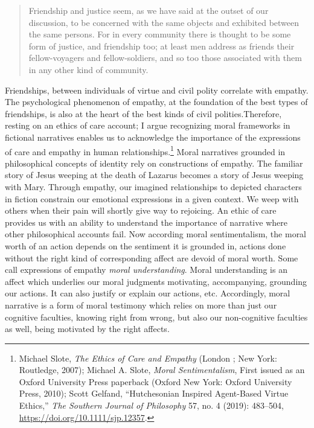 \documentclass[phdthesis,12pt,final]{wuthesis}
\theoremstyle{definition}
\theoremstyle{definition}
\theoremstyle{definition}
\theoremstyle{definition}
\theoremstyle{remark}
\begin{document}
\begin{quote}
Friendship and justice seem, as we have said at the outset of our discussion, to be concerned with the same objects and exhibited between the same persons. For in every community there is thought to be some form of justice, and friendship too; at least men address as friends their fellow-voyagers and fellow-soldiers, and so too those associated with them in any other kind of community.
\end{quote}

Friendships, between individuals of virtue and civil polity correlate with empathy. The psychological phenomenon of empathy, at the foundation of the best types of friendships, is also at the heart of the best kinds of civil polities.Therefore, resting on an ethics of care account; I argue recognizing moral frameworks in fictional narratives enables us to acknowledge the importance of the expressions of care and empathy in human relationships.\footnote{Michael Slote, \emph{The {Ethics} of {Care} and {Empathy}} (London ; New York: Routledge, 2007); Michael A. Slote, \emph{Moral {Sentimentalism}}, First issued as an Oxford University Press paperback (Oxford New York: Oxford University Press, 2010); Scott Gelfand, {``Hutchesonian Inspired Agent-Based Virtue Ethics,''} \emph{The Southern Journal of Philosophy} 57, no. 4 (2019): 483--504, \url{https://doi.org/10.1111/sjp.12357}.} Moral narratives grounded in philosophical concepts of identity rely on constructions of empathy. The familiar story of Jesus weeping at the death of Lazarus becomes a story of Jesus weeping with Mary. Through empathy, our imagined relationships to depicted characters in fiction constrain our emotional expressions in a given context. We weep with others when their pain will shortly give way to rejoicing. An ethic of care provides us with an ability to understand the importance of narrative where other philosophical accounts fail. Now according moral sentimentalism, the moral worth of an action depends on the sentiment it is grounded in, actions done without the right kind of corresponding affect are devoid of moral worth. Some call expressions of empathy \emph{moral understanding}. Moral understanding is an affect which underlies our moral judgments motivating, accompanying, grounding our actions. It can also justify or explain our actions, etc. Accordingly, moral narrative is a form of moral testimony which relies on more than just our cognitive faculties, knowing right from wrong, but also our non-cognitive faculties as well, being motivated by the right affects.
\end{document}
